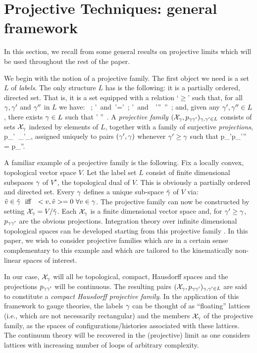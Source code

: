 \section{Projective Techniques: general framework}

In this section, we recall from \cite{MM,AL2} some general results on
projective limits which will be used throughout the rest of the paper.

We begin with the notion of a projective family. The first object we
need is a set $L$ of {\it labels}. The only structure $L$ has is the
following: it is a partially ordered, directed set. That is, it is a
set equipped with a relation `$\ge$' such that, for all $\gamma, \gamma'$ and
$\gamma''$ in $L$ we have:
%
\be \label{2.1a}
\g \ge \g\ ;\quad  
\g \ge \g'\ {\rm and}\  \g'\ge \g \Rightarrow \g =\g'\ ; \quad 
\g\ge\g'\ {\rm and}\ \ \g'\ge\g''\ \Rightarrow \g\ge\g''\ ;
\ee
%
and, given any $\gamma', \gamma'' \in L$, there exists $\gamma \in L$ such that
%
\be \label{2.1b}
 \g \ge \g'  \quad \g \ge \g''\ . \ee
%
A {\it projective family} $({\cal X}_\gamma,p_{\gamma\gamma'})_{\gamma,\gamma'\in L}$ consists
of sets ${\cal X}_\gamma$ indexed by elements of $L$, together with a family of
surjective {\it projections},
\be p_{\g\g'}\:\ \X_{\g'}\rightarrow \X_{\g},\ee
%
assigned uniquely to pairs $(\gamma',\gamma)$ whenever $\gamma'\ge\gamma$ 
such that
% 
\be\label{2.3}
p_{\g\g'}\circ p_{\g'\g''} = p_{\g\g''}.\ee 
%

A familiar example of a projective family is the following. Fix a
locally convex, topological vector space $V$. Let the label set $L$
consist of finite dimensional subspaces $\gamma$ of $V^\star$, the
topological dual of $V$. This is obviously a partially ordered and
directed set. Every $\gamma$ defines a unique sub-space $\tilde{\gamma}$ of
$V$ via: $\tilde{v} \in \tilde{\g}\ \ {\rm iff}\ \ <v, \tilde{v}> =0
\ \forall v\in \g$. The projective family can now be constructed by 
setting ${\cal X}_\gamma = V/\tilde{\gamma}$. Each ${\cal X}_\gamma$ is a finite dimensional
vector space and, for $\gamma'\ge \gamma$, $p_{\gamma \gamma'}$ are the obvious
projections. Integration theory over infinite dimensional topological
spaces can be developed starting from this projective family
\cite{K,DM}. In this paper, we wish to consider projective 
families which are in a certain sense complementary to this example
and which are tailored to the kinematically non-linear spaces of
interest.

In our case, ${\cal X}_\gamma$ will all be topological, compact, Hausdorff
spaces and the projections $p_{\gamma\gamma'}$ will be continuous.  The
resulting pairs $({\cal X}_\gamma, p_{\gamma \gamma'})_{\gamma,\gamma' \in L}$ are said to
constitute a {\it compact Hausdorff projective family}.  In the
application of this framework to gauge theories, the labels $\gamma$ can
be thought of as ``floating'' lattices (i.e., which are not
necessarily rectangular) and the members ${\cal X}_{\gamma}$ of the projective
family, as the spaces of configurations/histories associated with
these lattices.  The continuum theory will be recovered in the
(projective) limit as one considers lattices with increasing number
of loops of arbitrary complexity.

